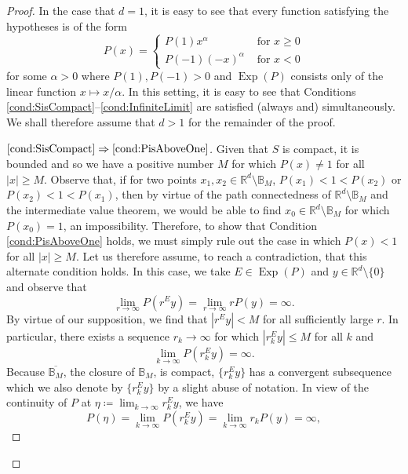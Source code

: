 \documentclass[11pt, letter]{book}
\newcommand*{\myproofname}{Proof}
\newenvironment{subproof}[1][\myproofname]{\begin{proof}[#1]\renewcommand*{\qedsymbol}{$\mathbin{/\mkern-6mu/}$}}{\end{proof}}
\newcommand\Exp{\operatorname{Exp}}
\begin{document}
\begin{proof}
In the case that $d=1$, it is easy to see that every function satisfying the hypotheses is of the form
\begin{equation*}
P(x)=\begin{cases}
P(1)x^\alpha & \mbox{ for }x\geq 0 \\
P(-1)(-x)^\alpha &\mbox{ for }x<0
\end{cases}
\end{equation*}
for some $\alpha>0$ where $P(1),P(-1)>0$ and $\Exp(P)$ consists only of the linear function $x\mapsto x/\alpha$. In this setting, it is easy to see that Conditions \ref{cond:SisCompact}--\ref{cond:InfiniteLimit} are satisfied (always and) simultaneously. We shall therefore assume that $d>1$ for the remainder of the proof.

\begin{subproof}[$\ref{cond:SisCompact}\Rightarrow\ref{cond:PisAboveOne}$]
Given that $S$ is compact, it is bounded and so we have a positive number $M$ for which $P(x)\neq 1$ for all $|x|\geq M$. Observe that, if for two points $x_1,x_2\in \mathbb{R}^d\setminus\mathbb{B}_M$, $P(x_1)<1<P(x_2)$ or $P(x_2)<1<P(x_1)$, then by virtue of the path connectedness of $\mathbb{R}^d\setminus\mathbb{B}_M$ and the intermediate value theorem, we would be able to find  $x_0\in\mathbb{R}^d\setminus\mathbb{B}_M$ for which $P(x_0)=1$, an impossibility. Therefore, to show that Condition \ref{cond:PisAboveOne} holds, we must simply rule out the case in which $P(x)<1$ for all $|x|\geq M$. Let us therefore assume, to reach a contradiction, that this alternate condition holds. In this case, we take $E\in\Exp(P)$ and $y\in\mathbb{R}^d\setminus \{0\}$ and observe that
\begin{equation*}
\lim_{r\to\infty}P(r^Ey)=\lim_{r\to\infty}rP(y)=\infty.
\end{equation*}
By virtue of our supposition, we find that $|r^Ey|<M$ for all sufficiently large $r$. In particular, there exists a sequence $r_k\to\infty$ for which $|r_k^Ey|\leq M$ for all $k$ and 
\begin{equation*}
\lim_{k\to\infty}P(r_k^Ey)=\infty.
\end{equation*}
Because $\overline{\mathbb{B}_M}$, the closure of $\mathbb{B}_M$, is compact, $\{r_k^Ey\}$ has a convergent subsequence which we also denote by $\{r_k^Ey\}$ by a slight abuse of notation. In view of the continuity of $P$ at $\eta\coloneqq\lim_{k\to\infty}r_k^Ey$, we have
\begin{equation*}
P(\eta)=\lim_{k\to\infty}P(r_k^Ey)=\lim_{k\to\infty}r_kP(y)=\infty,

\end{equation*}
\end{subproof}
\end{proof}
\end{document}
